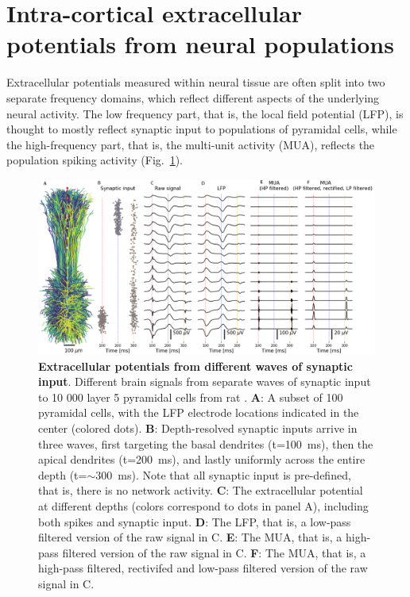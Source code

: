 \documentclass[preprint,11pt,authoryear]{elsarticle}
\begin{document}
\section{Intra-cortical extracellular potentials from neural populations}
Extracellular potentials measured within neural tissue are often split into two separate frequency domains, which reflect different aspects of the underlying neural activity. 
The low frequency part, that is, the local field potential (LFP), is thought to mostly reflect synaptic input to populations of pyramidal cells, while the high-frequency part, that is, the multi-unit activity (MUA), reflects the population spiking activity (Fig.~\ref{fig:LFP_MUA}).

\begin{figure}[!ht]
\begin{center}
\includegraphics[width=1\textwidth]{population_LFP_MUA.png}
\end{center}
\caption{\textbf{Extracellular potentials from different waves of synaptic input}. Different brain signals from separate waves of synaptic input to 10 000 layer 5 pyramidal cells from rat \citep{Hay2011}.
{\bf A}: A subset of 100 pyramidal cells, with the LFP electrode locations indicated in the center (colored dots).
{\bf B}: Depth-resolved synaptic inputs arrive in three waves, first targeting the basal dendrites (t=100~ms), then the apical dendrites (t=200~ms), and lastly uniformly across the entire depth (t=$\sim$300~ms). Note that all synaptic input is pre-defined, that is, there is no network activity.
{\bf C}: The extracellular potential at different depths (colors correspond to dots in panel A), including both spikes and synaptic input.
{\bf D}: The LFP, that is, a low-pass filtered version of the raw signal in C.
{\bf E}: The MUA, that is, a high-pass filtered version of the raw signal in C.
{\bf F}: The MUA, that is, a high-pass filtered, rectivifed and low-pass filtered version of the raw signal in C.
}
\label{fig:LFP_MUA}
\end{figure}
\end{document}
